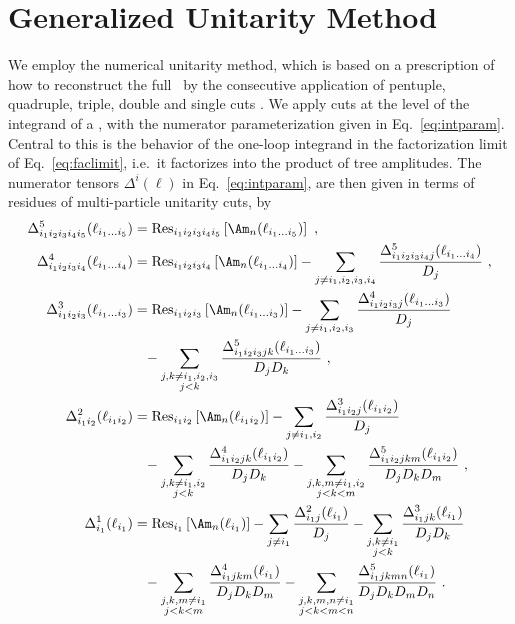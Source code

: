 \section{Generalized Unitarity Method}
We employ the numerical unitarity method, which is based on a prescription of how to reconstruct the full \ola~by the consecutive
application of pentuple, quadruple, triple, double and single cuts
\cite{Bern:1997sc,Britto:2004nc}. We apply cuts at the level of
the integrand of a \ola, with the numerator parameterization given in
Eq.~\eqref{eq:intparam}. Central to this is the behavior of the
one-loop integrand in the factorization limit of
Eq.~\eqref{eq:faclimit}, i.e.~it factorizes into the product of tree
amplitudes. The numerator tensors $\Delta^i(\ell)$ in
Eq.~\eqref{eq:intparam}, are then given in terms of residues of
multi-particle unitarity cuts, by
\begin{align}\label{eq:unitarityrel}
\begin{split}
  \Delta_{i_1i_2i_3i_4i_5}^5(\ell_{i_1\dots i_5}) &=
  \text{Res}_{i_1i_2i_3i_4i_5}\left[\Am_n(\ell_{i_1\dots i_5})\right]\
  ,\\
  \Delta_{i_1i_2i_3i_4}^4(\ell_{i_1\dots i_4}) &=
  \text{Res}_{i_1i_2i_3i_4}\left[\Am_n(\ell_{i_1\dots i_4})\right]-\sum_{j\neq
      i_1,i_2,i_3,i_4}\frac{\Delta_{i_1i_2i_3i_4j}^5(\ell_{i_1\dots
        i_4})}{D_j}\ ,\\
 \Delta_{i_1i_2i_3}^3(\ell_{i_1\dots i_3}) &=
  \text{Res}_{i_1i_2i_3}\left[\Am_n(\ell_{i_1\dots i_3})\right]-\sum_{j\neq
        i_1,i_2,i_3}\frac{\Delta^4_{i_1i_2i_3j}(\ell_{i_1\dots
          i_3})}{D_j} \\
     &\phantom{=} -\sum_{\substack{j,k\neq
          i_1,i_2,i_3\\j<k}}\frac{\Delta^5_{i_1i_2i_3jk}(\ell_{i_1\dots
          i_3})}{D_jD_k}\ ,\\
 \Delta_{i_1i_2}^2(\ell_{i_1i_2}) &=
  \text{Res}_{i_1i_2}\left[\Am_n(\ell_{i_1i_2})\right]-\sum_{j\neq
        i_1,i_2}\frac{\Delta^3_{i_1i_2j}(\ell_{i_1i_2})}{D_j}\\
&\phantom{=}-\sum_{\substack{j,k\neq
        i_1,i_2\\j< k}}\frac{\Delta^4_{i_1i_2jk}(\ell_{i_1i_2})}{D_jD_k} -
    \sum_{\substack{j,k,m\neq
        i_1,i_2\\j<k<m}}\frac{\Delta^5_{i_1i_2jkm}(\ell_{i_1i_2})}{D_jD_kD_m}\
    ,\\
 \Delta_{i_1}^1(\ell_{i_1})& =
  \text{Res}_{i_1}\left[\Am_n(\ell_{i_1})\right]-\sum_{j\neq
        i_1}\frac{\Delta^2_{i_1j}(\ell_{i_1})}{D_j}-\sum_{\substack{j,k\neq
        i_1\\j<k}}\frac{\Delta^3_{i_1jk}(\ell_{i_1})}{D_jD_k}\\
&\phantom{=}-\sum_{\substack{j,k,m\neq
        i_1\\j< k<m}}\frac{\Delta^4_{i_1jkm}(\ell_{i_1})}{D_jD_kD_m} -
    \sum_{\substack{j,k,m,n\neq
        i_1\\j<k<m<n}}\frac{\Delta^5_{i_1jkmn}(\ell_{i_1})}{D_jD_kD_mD_n}\
    .
\end{split}
\end{align}
